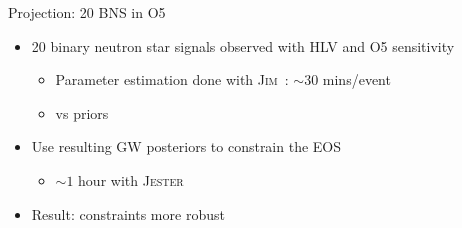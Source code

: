 \documentclass[usenames,dvipsnames,t]{beamer}
\begin{document}
\begin{frame}{Projection: 20 BNS in O5}
  \def\x{3mm}

  \begin{itemize}
    \item 20 binary neutron star signals observed with HLV and O5 sensitivity
    \begin{itemize}
      \item Parameter estimation done with \textsc{Jim}~\cite{Wong:2023lgb, Wouters:2024oxj}: $\sim 30$ mins/event
      \item \textbf{} vs \textbf{} priors
    \end{itemize}

    \vspace{\x}

    \item Use resulting GW posteriors to constrain the EOS
    \begin{itemize}
      \item $\sim 1$ hour with \textsc{Jester}~\cite{Wouters:2025zju}
    \end{itemize}

    \vspace{\x}

    \item Result: constraints more robust
  \end{itemize}

  \vspace{\x}


\end{frame}
\end{document}
